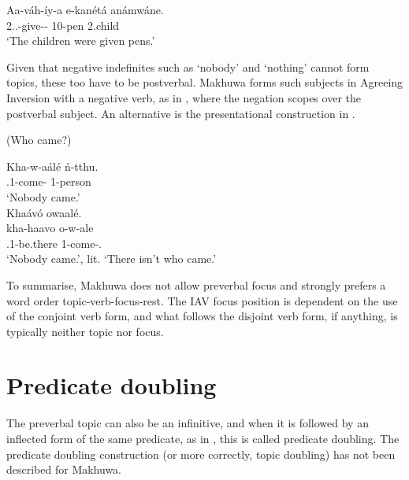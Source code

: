 \documentclass[output=paper]{langscibook}
\begin{document}
\ex
\gll
Aa-váh-íy-a  e-kanétá  anámwáne.\\
2\SM{}.\PFV{}.\DJ{}-give-\PASS-\FV{}  10-pen  2.child \\
\glt
‘The children were given pens.’ \citep[198]{vanderWal2009a}\\

\z
\z

Given that negative indefinites such as ‘nobody’ and ‘nothing’ cannot form topics, these too have to be postverbal. Makhuwa forms such subjects in Agreeing Inversion with a negative verb, as in , where the negation scopes over the postverbal subject. An alternative is the presentational construction in .

\ea
\label{bkm:Ref109898867}(Who came?)

\ea
\label{bkm:Ref109898867:a}
\gll
Kha-w-aálé  ń-tthu.\\
\NEG{}.1\SM{}-come-\PFV{}  1-person\\
\glt
‘Nobody came.’\\


\ex
\label{bkm:Ref109898867:b}
Khaávó owaalé.\\
\gll
kha-haavo  o-w-ale\\
\NEG{}.1\SM{}-be.there  1-come-\PFV{}.\REL{}\\
\glt
‘Nobody came.’, lit. ‘There isn’t who came.’\\


\z
\z

To summarise, Makhuwa does not allow preverbal focus and strongly prefers a word order topic-verb-focus-rest. The IAV focus position is dependent on the use of the conjoint verb form, and what follows the disjoint verb form, if anything, is typically neither topic nor focus.

\section{Predicate doubling}
\label{bkm:Ref117578690}
The preverbal topic can also be an infinitive, and when it is followed by an inflected form of the same predicate, as in , this is called predicate doubling. The predicate doubling construction (or more correctly, topic doubling) has not been described for Makhuwa. 
\end{document}
